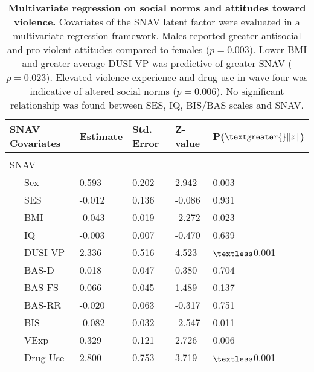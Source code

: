 \documentclass[utf8]{article}
\begin{document}
\begin{table}[]
\begin{tabular}{lllll}
SNAV Covariates  & Estimate & Std. Error & Z-value & P($\textgreater{}\|z\|$) \\ \hline \\
SNAV                 &          &            &         &                          \\
\ \ \ Sex              & 0.593    & 0.202      & 2.942   & 0.003                    \\
\ \ \ SES              & -0.012   & 0.136      & -0.086  & 0.931                    \\
\ \ \ BMI              & -0.043   & 0.019      & -2.272  & 0.023                    \\
\ \ \ IQ               & -0.003   & 0.007      & -0.470  & 0.639                    \\
\ \ \ DUSI-VP          & 2.336    & 0.516      & 4.523   & $\textless$0.001                    \\
\ \ \ BAS-D            & 0.018    & 0.047      & 0.380   & 0.704                    \\
\ \ \ BAS-FS           & 0.066    & 0.045      & 1.489   & 0.137                    \\
\ \ \ BAS-RR           & -0.020   & 0.063      & -0.317  & 0.751                    \\
\ \ \ BIS              & -0.082   & 0.032      & -2.547  & 0.011                   \\
\ \ \ VExp             & 0.329    & 0.121      & 2.726   & 0.006                    \\
\ \ \ Drug Use           & 2.800    & 0.753      & 3.719   & $\textless$0.001                    
\end{tabular}
\caption{\textbf{Multivariate regression on social norms and attitudes toward violence.} Covariates of the SNAV latent factor were evaluated in a multivariate regression framework. Males reported greater antisocial and pro-violent attitudes compared to females ($p=0.003$). Lower BMI and greater average DUSI-VP was predictive of greater SNAV ($p=0.023$). Elevated violence experience and drug use in wave four was indicative of altered social norms ($p=0.006$). No significant relationship was found between SES, IQ, BIS/BAS scales and SNAV. \label{tab:10}}
\end{table}
\end{document}
